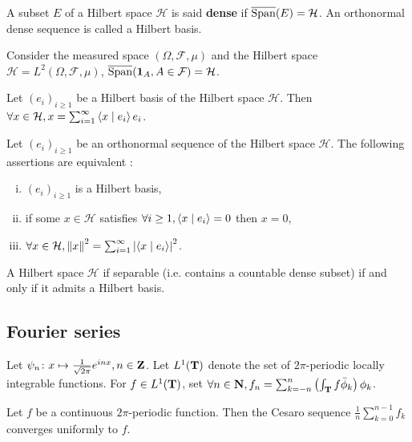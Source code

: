 	\begin{defn}
		A subset $E$ of a Hilbert space $\mathcal{H}$ is said \textbf{dense} if $\overline{\operatorname{Span}}(E) = \mathcal{H}$.
		An orthonormal dense sequence is called a Hilbert basis.
	\end{defn}

	\begin{pop}
		Consider the measured space $(\Omega, \mathcal{F}, \mu)$ and the Hilbert space $\mathcal{H} = L^2(\Omega, \mathcal{F}, \mu)$, $\overline{\operatorname{Span}}(\operatorname{\mathbf{1}}_A, A \in \mathcal{F}) = \mathcal{H}$.
	\end{pop}

	\begin{thm}
		Let $(e_i)_{i \geq 1}$ be a Hilbert basis of the Hilbert space $\mathcal{H}$.
		Then $\forall x \in \mathcal{H}, x = \sum_{i = 1}^\infty \left\langle x \mid e_i \right\rangle e_i$.
	\end{thm}

	\begin{thm}
		Let $(e_i)_{i \geq 1}$ be an orthonormal sequence of the Hilbert space $\mathcal{H}$.
		The following assertions are equivalent :
		\begin{enumerate}[(i)]
			\item $(e_i)_{i \geq 1}$ is a Hilbert basis,
			\item if some $x \in \mathcal{H}$ satisfies $\forall i \geq 1, \left\langle x \mid e_i \right\rangle = 0$ then $x = 0$,
			\item $\forall x \in \mathcal{H}, \left\lVert x\right\rVert^2 = \sum_{i = 1}^\infty \left\lvert\left\langle x \mid e_i \right\rangle\right\rvert^2$.
		\end{enumerate}
	\end{thm}

	\begin{thm}
		A Hilbert space $\mathcal{H}$ if separable (i.e. contains a countable dense subset) if and only if it admits a Hilbert basis.
	\end{thm}


\subsection{Fourier series}

	Let $\psi_n \colon x \mapsto \frac{1}{\sqrt{2\pi}} e^{inx}, n \in \mathbf{Z}$.
	Let $L^1(\mathbf{T})$ denote the set of $2\pi$-periodic locally integrable functions.
	For $f \in L^1(\mathbf{T})$, set $\forall n \in \mathbf{N}, f_n = \sum_{k = -n}^n \left( \int_{\mathbf{T}} f \bar\phi_k \right) \phi_k$.

	\begin{thm}
		Let $f$ be a continuous $2\pi$-periodic function.
		Then the Cesaro sequence $\frac{1}{n} \sum_{k = 0}^{n - 1} f_k$ converges uniformly to $f$.
	\end{thm}

